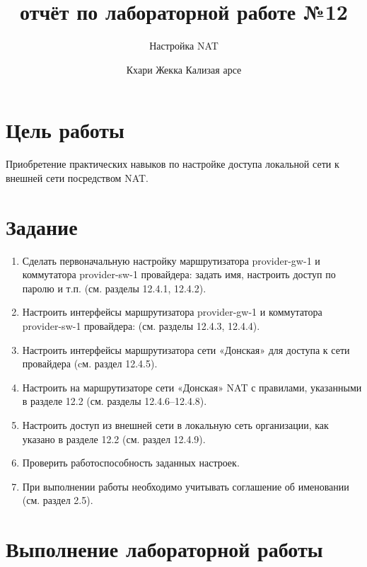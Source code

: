 \documentclass[
  english,
  russian,
  12pt,
  a4paper,
  DIV=11,
  numbers=noendperiod]{scrreprt}
\title{отчёт по лабораторной работе №12}
\subtitle{Настройка NAT}
\author{Кхари Жекка Кализая арсе}
\date{}
\providecommand{\tightlist}{%
  \setlength{\itemsep}{0pt}\setlength{\parskip}{0pt}}
\renewcommand*\contentsname{Содержание}
\newcommand\contentsname{Содержание}
\begin{document}
\maketitle

\renewcommand*\contentsname{Содержание}
{
\setcounter{tocdepth}{1}
\tableofcontents
}
\listoffigures
\listoftables

\chapter{Цель
работы}\label{ux446ux435ux43bux44c-ux440ux430ux431ux43eux442ux44b}

Приобретение практических навыков по настройке доступа локальной сети к
внешней сети посредством NAT.

\chapter{Задание}\label{ux437ux430ux434ux430ux43dux438ux435}

\begin{enumerate}
\def\labelenumi{\arabic{enumi}.}
\tightlist
\item
  Сделать первоначальную настройку маршрутизатора provider-gw-1 и
  коммутатора provider-sw-1 провайдера: задать имя, настроить доступ по
  паролю и т.п. (см. разделы 12.4.1, 12.4.2).
\item
  Настроить интерфейсы маршрутизатора provider-gw-1 и коммутатора
  provider-sw-1 провайдера: (см. разделы 12.4.3, 12.4.4).
\item
  Настроить интерфейсы маршрутизатора сети «Донская» для доступа к сети
  провайдера (cм. раздел 12.4.5).
\item
  Настроить на маршрутизаторе сети «Донская» NAT с правилами, указанными
  в разделе 12.2 (см. разделы 12.4.6--12.4.8).
\item
  Настроить доступ из внешней сети в локальную сеть организации, как
  указано в разделе 12.2 (см. раздел 12.4.9).
\item
  Проверить работоспособность заданных настроек.
\item
  При выполнении работы необходимо учитывать соглашение об именовании
  (см. раздел 2.5).
\end{enumerate}

\chapter{Выполнение лабораторной
работы}\label{ux432ux44bux43fux43eux43bux43dux435ux43dux438ux435-ux43bux430ux431ux43eux440ux430ux442ux43eux440ux43dux43eux439-ux440ux430ux431ux43eux442ux44b}
\end{document}
